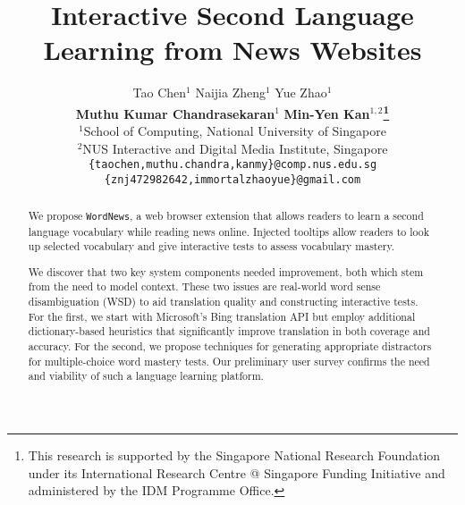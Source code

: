 \documentclass[11pt]{article}
\title{Interactive Second Language Learning from News Websites}
\author{
  	Tao Chen$^{1}$\qquad 
  	Naijia Zheng$^{1}$\qquad
  	Yue Zhao$^{1}$ \\
  	{\bf Muthu Kumar Chandrasekaran$^{1}$}\qquad 
  	{\bf Min-Yen Kan$^{1,2}$\thanks{\hspace{.2cm}This research is supported by the Singapore National Research Foundation under its International Research Centre @ Singapore Funding Initiative and administered by the IDM Programme Office.}}\\ 
  	$^{1}$School of Computing, National University of Singapore\\
  	$^{2}$NUS Interactive and Digital Media Institute, Singapore\\
  	{\tt \{taochen,muthu.chandra,kanmy\}@comp.nus.edu.sg}  \\ 
  	{\tt \{znj472982642,immortalzhaoyue\}@gmail.com}}
\date{}
\begin{document}
\maketitle
\begin{abstract}


We propose {\tt WordNews}, a web browser extension that allows readers to learn a
second language vocabulary while reading news online.  Injected
tooltips allow readers to look up selected vocabulary and give
interactive tests to assess vocabulary mastery.  

We discover that two key system components needed improvement, both
which stem from the need to model context.  These two issues are
real-world word sense disambiguation (WSD) to aid translation quality
and constructing interactive tests. For the first, we start with
Microsoft's Bing translation API but employ additional
dictionary-based heuristics that significantly improve translation in
both coverage and accuracy. For the second, we propose techniques for
generating appropriate distractors for multiple-choice word mastery
tests.  Our preliminary user survey confirms the need and viability of
such a language learning platform.

\end{abstract}









%
%



\end{document}
